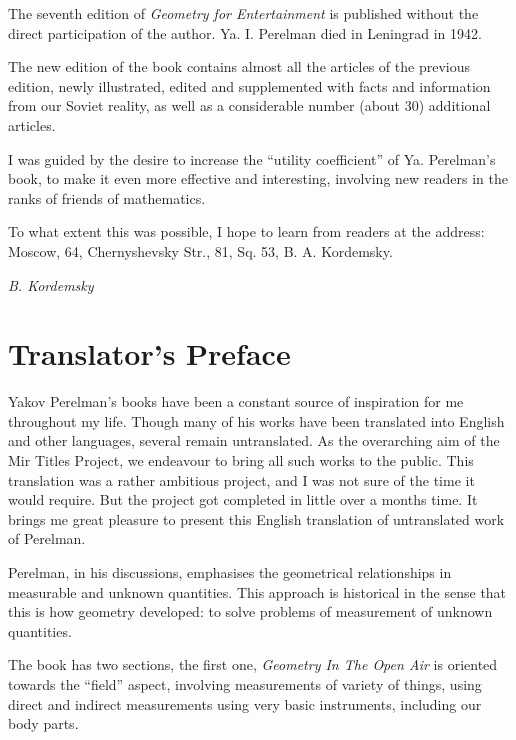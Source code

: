The seventh edition of \emph{Geometry for Entertainment} is published without the direct participation of the author. Ya. I. Perelman died in Leningrad in 1942.

The new edition of the book contains almost all the articles of the previous edition, newly illustrated, edited and supplemented with facts and information from our Soviet reality, as well as a considerable number (about 30) additional articles.

I was guided by the desire to increase the ``utility coefficient'' of Ya. Perelman's book, to make it even more effective and interesting, involving new readers in the ranks of friends of mathematics.

To what extent this was possible, I hope to learn from readers at the address: Moscow, 64, Chernyshevsky Str., 81, Sq. 53, B. A. Kordemsky.


\begin{flushright}
\emph{B. Kordemsky}
\end{flushright}


\chapter{Translator's Preface}
\label{translator-preface}


Yakov Perelman's books have been a constant source of inspiration for me throughout my life. Though many of his works have been translated into English and other languages, several remain untranslated. As the overarching aim of the Mir Titles Project, we endeavour to bring all such works to the public. This translation was a rather ambitious project, and I was not sure of the time it would require. But the project got completed in little over a months time. It brings me great pleasure to present this English translation of untranslated work of Perelman.


Perelman, in his discussions, emphasises the geometrical relationships in measurable and unknown quantities. This approach is historical in the sense that this is how geometry developed: to solve problems of measurement of unknown quantities. 

The book has two sections, the first one, \emph{Geometry In The Open Air} is oriented towards the ``field'' aspect, involving measurements of variety of things, using direct and indirect measurements using very basic instruments, including our body parts. 


